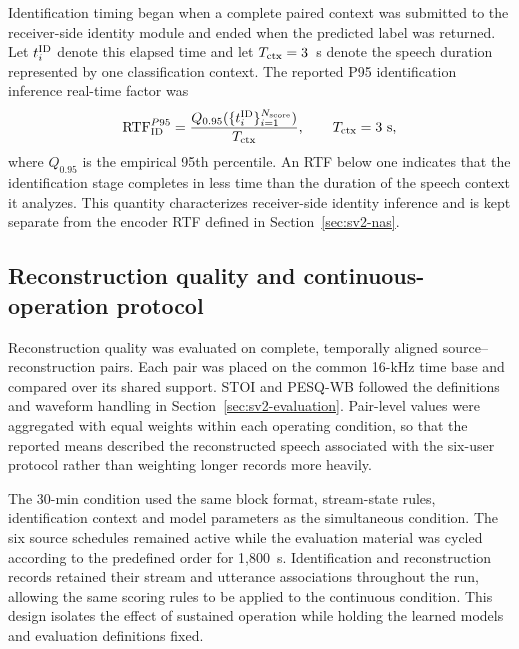 Identification timing began when a complete paired context was submitted to the receiver-side identity module and ended when the predicted label was returned. Let $t_i^{\rm ID}$ denote this elapsed time and let $T_{\rm ctx}=3$~s denote the speech duration represented by one classification context. The reported P95 identification inference real-time factor was
\begin{equation}
 \operatorname{RTF}_{\rm ID}^{P95}
 =\frac{Q_{0.95}(\{t_i^{\rm ID}\}_{i=1}^{N_{\rm score}})}{T_{\rm ctx}},
 \qquad T_{\rm ctx}=3~\mathrm{s},
 \label{eq:sv3-six-user-rtf}
\end{equation}
where $Q_{0.95}$ is the empirical 95th percentile. An RTF below one indicates that the identification stage completes in less time than the duration of the speech context it analyzes. This quantity characterizes receiver-side identity inference and is kept separate from the encoder RTF defined in Section~\ref{sec:sv2-nas}.

\subsection{Reconstruction quality and continuous-operation protocol}
Reconstruction quality was evaluated on complete, temporally aligned source--reconstruction pairs. Each pair was placed on the common 16-kHz time base and compared over its shared support. STOI and PESQ-WB followed the definitions and waveform handling in Section~\ref{sec:sv2-evaluation}. Pair-level values were aggregated with equal weights within each operating condition, so that the reported means described the reconstructed speech associated with the six-user protocol rather than weighting longer records more heavily.

The 30-min condition used the same block format, stream-state rules, identification context and model parameters as the simultaneous condition. The six source schedules remained active while the evaluation material was cycled according to the predefined order for 1,800~s. Identification and reconstruction records retained their stream and utterance associations throughout the run, allowing the same scoring rules to be applied to the continuous condition. This design isolates the effect of sustained operation while holding the learned models and evaluation definitions fixed.
